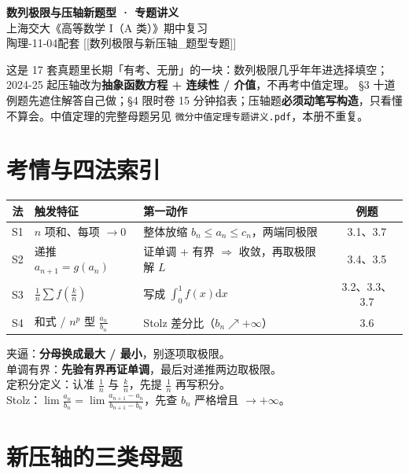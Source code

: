 \documentclass[11pt,a4paper]{ctexart}
\newcommand{\D}{\mathrm{d}}
\begin{document}
\begin{center}
  {\LARGE\bfseries 数列极限与压轴新题型 · 专题讲义}\\[4pt]
  {\large 上海交大《高等数学 I（A 类）》期中复习}\\[4pt]
  {\small 陶理-11-04\quad 配套 [[数列极限与新压轴\_题型专题]]}
\end{center}

\begin{keypoint}[怎么用这本]
这是 17 套真题里长期「有考、无册」的一块：数列极限几乎年年进选择填空；2024-25 起压轴改为\textbf{抽象函数方程 + 连续性 / 介值}，不再考中值定理。
\S 3 十道例题先遮住解答自己做；\S 4 限时卷 15 分钟掐表；压轴题\textbf{必须动笔写构造}，只看懂不算会。中值定理的完整母题另见 \texttt{微分中值定理专题讲义.pdf}，本册不重复。
\end{keypoint}

\section{考情与四法索引}

\begin{center}
\begin{tabularx}{15.2cm}{@{}c l X c@{}}
\toprule
法 & 触发特征 & 第一动作 & 例题 \\
\midrule
S1 & $n$ 项和、每项 $\to0$ & 整体放缩 $b_n\le a_n\le c_n$，两端同极限 & 3.1、3.7 \\
S2 & 递推 $a_{n+1}=g(a_n)$ & 证单调 + 有界 $\Rightarrow$ 收敛，再取极限解 $L$ & 3.4、3.5 \\
S3 & $\frac1n\sum f(\frac kn)$ & 写成 $\int_0^1 f(x)\D x$ & 3.2、3.3、3.7 \\
S4 & 和式 / $n^p$ 型 $\frac{a_n}{b_n}$ & Stolz 差分比（$b_n\nearrow+\infty$） & 3.6 \\
\bottomrule
\end{tabularx}
\end{center}

\begin{methodbox}[四句口令]
夹逼：\textbf{分母换成最大 / 最小}，别逐项取极限。\\
单调有界：\textbf{先验有界再证单调}，最后对递推两边取极限。\\
定积分定义：认准 $\frac1n$ 与 $\frac kn$，先提 $\frac1n$ 再写积分。\\
Stolz：$\lim\frac{a_n}{b_n}=\lim\frac{a_{n+1}-a_n}{b_{n+1}-b_n}$，先查 $b_n$ 严格增且 $\to+\infty$。
\end{methodbox}

\section{新压轴的三类母题}
\end{document}
